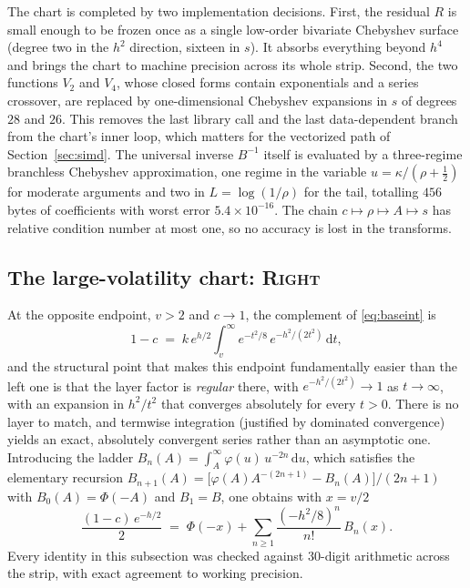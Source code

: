 \documentclass[11pt]{article}
\newcommand{\PhiN}{\Phi}
\newcommand{\rtag}[1]{{\normalfont\scshape #1}}
\begin{document}
The chart is completed by two implementation decisions. First, the residual $R$ is small enough to be frozen once as a single low-order bivariate Chebyshev surface (degree two in the $h^2$ direction, sixteen in $s$). It absorbs everything beyond $h^4$ and brings the chart to machine precision across its whole strip. Second, the two functions $V_2$ and $V_4$, whose closed forms contain exponentials and a series crossover, are replaced by one-dimensional Chebyshev expansions in $s$ of degrees $28$ and $26$. This removes the last library call and the last data-dependent branch from the chart's inner loop, which matters for the vectorized path of Section~\ref{sec:simd}. The universal inverse $B^{-1}$ itself is evaluated by a three-regime branchless Chebyshev approximation, one regime in the variable $u=\kappa/(\rho+\tfrac12)$ for moderate arguments and two in $L=\log(1/\rho)$ for the tail, totalling $456$ bytes of coefficients with worst error $5.4\times10^{-16}$. The chain $c\mapsto\rho\mapsto A\mapsto s$ has relative condition number at most one, so no accuracy is lost in the transforms.

\subsection{The large-volatility chart: \rtag{Right}}
\label{sec:right}

At the opposite endpoint, $v>2$ and $c\to1$, the complement of \eqref{eq:baseint} is
\begin{equation}
  1-c \;=\; k\,e^{h/2}\int_v^\infty e^{-t^2/8}\,e^{-h^2/(2t^2)}\,\mathrm{d}t ,
\end{equation}
and the structural point that makes this endpoint fundamentally easier than the left one is that the layer factor is \emph{regular} there, with $e^{-h^2/(2t^2)}\to1$ as $t\to\infty$, with an expansion in $h^2/t^2$ that converges absolutely for every $t>0$. There is no layer to match, and termwise integration (justified by dominated convergence) yields an exact, absolutely convergent series rather than an asymptotic one. Introducing the ladder $B_n(A)=\int_A^\infty\varphi(u)\,u^{-2n}\,\mathrm{d}u$, which satisfies the elementary recursion $B_{n+1}(A)=\bigl[\varphi(A)A^{-(2n+1)}-B_n(A)\bigr]/(2n+1)$ with $B_0(A)=\PhiN(-A)$ and $B_1=B$, one obtains with $x=v/2$
\begin{equation}
  \frac{(1-c)\,e^{-h/2}}{2}
   \;=\; \PhiN(-x) + \sum_{n\ge1}\frac{(-h^2/8)^n}{n!}\,B_n(x).
  \label{eq:rightchart}
\end{equation}
Every identity in this subsection was checked against 30-digit arithmetic across the strip, with exact agreement to working precision.
\end{document}
